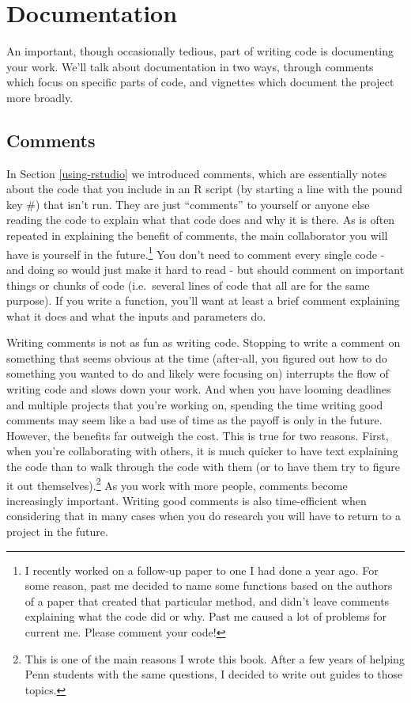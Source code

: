 \documentclass[
]{krantz}
\begin{document}
\hypertarget{documentation}{%
\section{Documentation}\label{documentation}}

An important, though occasionally tedious, part of writing code is documenting your work. We'll talk about documentation in two ways, through comments which focus on specific parts of code, and vignettes which document the project more broadly.

\hypertarget{comments}{%
\subsection{Comments}\label{comments}}

In Section \ref{using-rstudio} we introduced comments, which are essentially notes about the code that you include in an R script (by starting a line with the pound key \#) that isn't run. They are just ``comments'' to yourself or anyone else reading the code to explain what that code does and why it is there. As is often repeated in explaining the benefit of comments, the main collaborator you will have is yourself in the future.\footnote{I recently worked on a follow-up paper to one I had done a year ago. For some reason, past me decided to name some functions based on the authors of a paper that created that particular method, and didn't leave comments explaining what the code did or why. Past me caused a lot of problems for current me. Please comment your code!} You don't need to comment every single code - and doing so would just make it hard to read - but should comment on important things or chunks of code (i.e.~several lines of code that all are for the same purpose). If you write a function, you'll want at least a brief comment explaining what it does and what the inputs and parameters do.

Writing comments is not as fun as writing code. Stopping to write a comment on something that seems obvious at the time (after-all, you figured out how to do something you wanted to do and likely were focusing on) interrupts the flow of writing code and slows down your work. And when you have looming deadlines and multiple projects that you're working on, spending the time writing good comments may seem like a bad use of time as the payoff is only in the future. However, the benefits far outweigh the cost. This is true for two reasons. First, when you're collaborating with others, it is much quicker to have text explaining the code than to walk through the code with them (or to have them try to figure it out themselves).\footnote{This is one of the main reasons I wrote this book. After a few years of helping Penn students with the same questions, I decided to write out guides to those topics.} As you work with more people, comments become increasingly important. Writing good comments is also time-efficient when considering that in many cases when you do research you will have to return to a project in the future.
\end{document}
